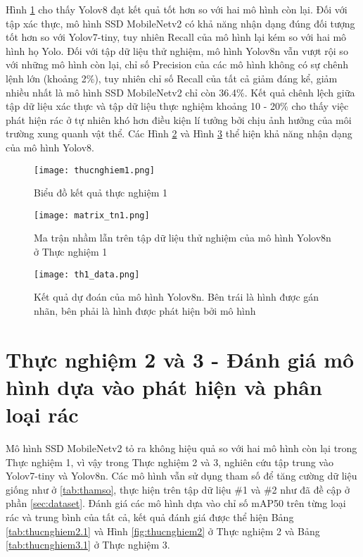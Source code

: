 \documentclass[../the.tex]{subfiles}
\begin{document}
\bigskip

{\fontsize{13}{12} \selectfont
Hình \ref{fig:thucnghiem1} cho thấy Yolov8 đạt kết quả tốt hơn so với hai mô hình còn lại. Đối với tập xác thực, mô hình SSD MobileNetv2 có khả năng nhận dạng đúng đối tượng tốt hơn so với Yolov7-tiny, tuy nhiên Recall của mô hình lại kém so với hai mô hình họ Yolo.
Đối với tập dữ liệu thử nghiệm, mô hình Yolov8n vẫn vượt rội so với những mô hình còn lại, chỉ số Precision của các mô hình không có sự chênh lệnh lớn (khoảng 2\%), tuy nhiên chỉ số Recall của tất cả giảm đáng kể, giảm nhiều nhất là mô hình SSD MobileNetv2 chỉ còn 36.4\%.
Kết quả chênh lệch giữa tập dữ liệu xác thực và tập dữ liệu thực nghiệm khoảng 10 - 20\% cho thấy việc phát hiện rác ở tự nhiên khó hơn điều kiện lí tưởng bởi chịu ảnh hưởng của môi trường xung quanh vật thể.
Các Hình \ref{fig:thucnghiem1.2} và Hình \ref{fig:thucnghiem1.3} thể hiện khả năng nhận dạng của mô hình Yolov8.

}

\begin{figure}[H]
    \centering
    \texttt{[image: thucnghiem1.png]}
    \caption{Biểu đồ kết quả thực nghiệm 1}
    \label{fig:thucnghiem1}
\end{figure}

\begin{figure}[H]
    \centering
    \texttt{[image: matrix\_tn1.png]}
    \caption{Ma trận nhầm lẫn trên tập dữ liệu thử nghiệm của mô hình Yolov8n ở Thực nghiệm 1}
    \label{fig:thucnghiem1.2}
\end{figure}

\begin{figure}[H]
    \centering
    \texttt{[image: th1\_data.png]}
    \caption{Kết quả dự đoán của mô hình Yolov8n. Bên trái là hình được gán nhãn, bên phải là hình được phát hiện bởi mô hình}
    \label{fig:thucnghiem1.3}
\end{figure}

\section{Thực nghiệm 2 và 3 - Đánh giá mô hình dựa vào phát hiện và phân loại rác}
 {\fontsize{13}{12} \selectfont
  Mô hình SSD MobileNetv2 tỏ ra không hiệu quả so với hai mô hình còn lại trong Thực nghiệm 1, vì vậy trong Thực nghiệm 2 và 3, nghiên cứu tập trung vào Yolov7-tiny và Yolov8n. Các mô hình vẫn sử dụng tham số để tăng cường dữ liệu giống như ở \ref{tab:thamso}, thực hiện trên tập dữ liệu \#1 và \#2 như đã đề cập ở phần \ref{sec:dataset}.
  Đánh giá các mô hình dựa vào chỉ số mAP50 trên từng loại rác và trung bình của tất cả, kết quả đánh giá được thể hiện Bảng \ref{tab:thucnghiem2.1} và Hình \ref{fig:thucnghiem2} ở Thực nghiệm 2 và Bảng \ref{tab:thucnghiem3.1} ở Thực nghiệm 3.
 }
\end{document}
